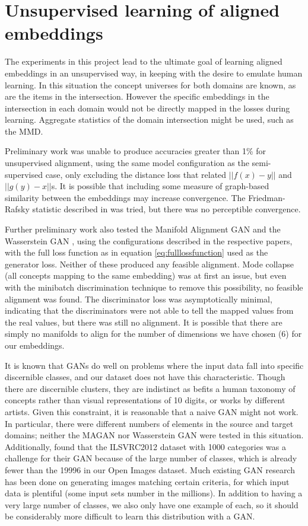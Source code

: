 \section{Unsupervised learning of aligned embeddings}

The experiments in this project lead to the ultimate goal of learning aligned embeddings in an unsupervised way, in keeping with the desire to emulate human learning. In this situation the concept universes for both domains are known, as are the items in the intersection. However the specific embeddings in the intersection in each domain would not be directly mapped in the losses during learning. Aggregate statistics of the domain intersection might be used, such as the MMD. 

Preliminary work was unable to produce accuracies greater than 1\% for unsupervised alignment, using the same model configuration as the semi-supervised case, only excluding the distance loss that related $||f(x) - y||$ and $||g(y) - x||$s. It is possible that including some measure of graph-based similarity between the embeddings may increase convergence. The Friedman-Rafsky statistic described in \cite{torchtwosample} was tried, but there was no perceptible convergence.

Further preliminary work also tested the Manifold Alignment GAN \cite{magan} and the Wasserstein GAN \cite{WassersteinGAN}, using the configurations described in the respective papers, with the full loss function as in  equation \ref{eq:fulllossfunction} used as the generator loss. Neither of these produced any feasible alignment. Mode collapse (all concepts mapping to the same embedding) was at first an issue, but even with the minibatch discrimination technique \cite{ImprovedTechniquesTrainingGANS} to remove this possibility, no feasible alignment was found. The discriminator loss was asymptotically minimal, indicating that the discriminators were not able to tell the mapped values from the real values, but there was still no alignment. It is possible that there are simply no manifolds to align for the number of dimensions we have chosen (6) for our embeddings. 

It is known that GANs do well on problems where the input data fall into specific discernible classes, and our dataset does not have this characteristic. Though there are discernible clusters, they are indistinct as befits a human taxonomy of concepts rather than visual representations of 10 digits, or works by different artists. Given this constraint, it is reasonable that a naive GAN might not work. In particular, there were different numbers of elements in the source and target domains; neither the MAGAN nor Wasserstein GAN were tested in this situation. Additionally, \cite{ImprovedTechniquesTrainingGANS} found that the ILSVRC2012 dataset with 1000 categories was a challenge for their GAN because of the large number of classes, which is already fewer than the 19996 in our Open Images dataset. Much existing GAN research has been done on generating images matching certain criteria, for which input data is plentiful (some input sets number in the millions). In addition to having a very large number of classes, we also only have one example of each, so it should be considerably more difficult to learn this distribution with a GAN. 